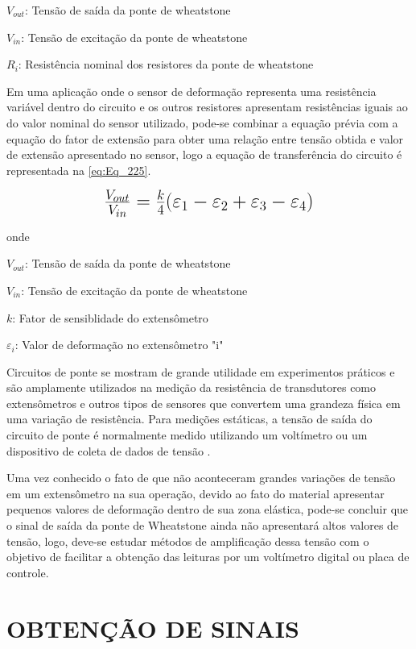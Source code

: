 $V_{out}$: Tensão de saída da ponte de wheatstone

$V_{in}$: Tensão de excitação da ponte de wheatstone

$R_i$: Resistência nominal dos resistores da ponte de wheatstone

\hfill

Em uma aplicação onde o sensor de deformação representa uma resistência variável dentro do circuito e os outros resistores apresentam resistências
iguais ao do valor nominal do sensor utilizado, pode-se combinar a equação prévia com a equação do fator de extensão para obter uma relação entre tensão obtida
e valor de extensão apresentado no sensor, logo a equação de transferência do circuito é representada na \autoref{eq:Eq_225}.

\begin{equation}\label{eq:Eq_225}%
\mbox{\fontsize{17.28}{21.6}\selectfont\( %
\frac{V_{out}}{V_{in}} = \frac{k}{4}(\varepsilon_1 - \varepsilon_2 + \varepsilon_3 - \varepsilon_4)
\)} %
\end{equation}

onde

$V_{out}$: Tensão de saída da ponte de wheatstone

$V_{in}$: Tensão de excitação da ponte de wheatstone

$k$: Fator de sensiblidade do extensômetro

$\varepsilon_{i}$: Valor de deformação no extensômetro "i"

\hfill

Circuitos de ponte se mostram de grande utilidade em experimentos práticos e são amplamente utilizados na medição da resistência de transdutores como extensômetros
e outros tipos de sensores que convertem uma grandeza física em uma variação de resistência. Para medições estáticas, a tensão de saída do circuito de ponte é normalmente
medido utilizando um voltímetro ou um dispositivo de coleta de dados de tensão \autocite{Hollman2011}.

Uma vez conhecido o fato de que não aconteceram grandes variações de tensão em um extensômetro na sua operação, devido ao fato do material apresentar pequenos valores de
deformação dentro de sua zona elástica, pode-se concluir que o sinal de saída da ponte de Wheatstone ainda não apresentará altos valores de tensão, logo, deve-se estudar métodos de
amplificação dessa tensão com o objetivo de facilitar a obtenção das leituras por um voltímetro digital ou placa de controle.

\section{OBTENÇÃO DE SINAIS}

